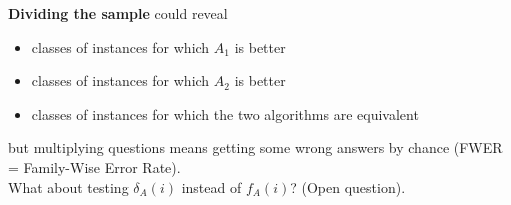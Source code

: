 \textbf{Dividing the sample} could reveal
\begin{itemize}
	\item classes of instances for which $A_1$ is better
	\item classes of instances for which $A_2$ is better
	\item classes of instances for which the two algorithms are equivalent
\end{itemize}
but multiplying questions means getting some wrong answers by chance (FWER = Family-Wise Error Rate). \\

What about testing $\delta_A (i)$ instead of $f_A (i )$? (Open question).\\


\newpage